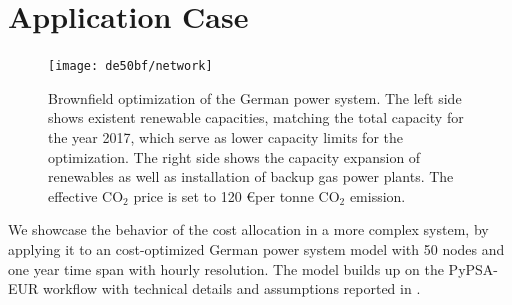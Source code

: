 \documentclass[11pt,twocolumn]{article}
\newcommand{\lmp}[1][n]{\lambda_{#1,t}}
\newcommand{\demand}[1][n]{d_{#1,t}}
\begin{document}



\section{Application Case}
% 
\begin{figure}[t]
    \centering
    \texttt{[image: de50bf/network]}
    \caption{Brownfield optimization of the German power system. The left side shows existent renewable capacities, matching the total capacity for the year 2017, which serve as lower capacity limits for the optimization. The right side shows the capacity expansion of renewables as well as installation of backup gas power plants. The effective CO$_2$ price is set to 120 \euro per tonne CO$_2$ emission.}
    \label{fig:network}
\end{figure}
% 
We showcase the behavior of the cost allocation in a more complex system, by applying it to an cost-optimized German power system model with 50 nodes and one year time span with hourly resolution. The model builds up on the PyPSA-EUR workflow \cite{horsch_jonas_pypsa-eur_2020} with technical details and assumptions reported in \cite{horsch_pypsa-eur_2018}. 
\end{document}
